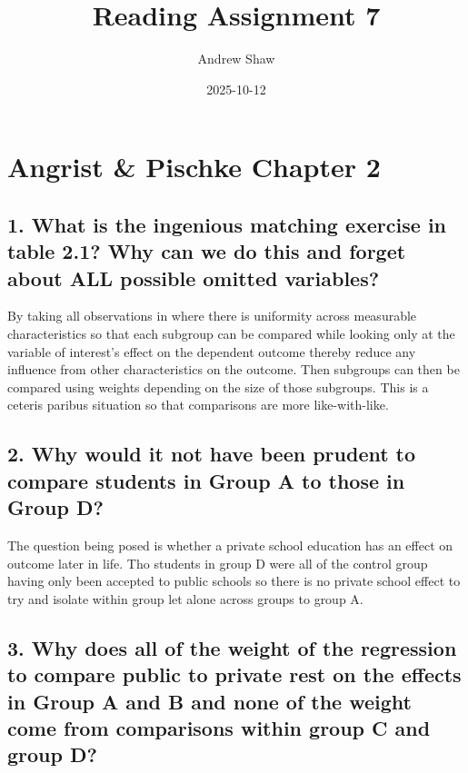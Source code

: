 \documentclass[
]{article}
\title{Reading Assignment 7}
\author{Andrew Shaw}
\date{2025-10-12}
\begin{document}
\maketitle

\section{Angrist \& Pischke Chapter 2}\label{angrist-pischke-chapter-2}

\subsection{1. What is the ingenious matching exercise in table 2.1? Why
can we do this and forget about ALL possible omitted
variables?}\label{what-is-the-ingenious-matching-exercise-in-table-2.1-why-can-we-do-this-and-forget-about-all-possible-omitted-variables}

By taking all observations in where there is uniformity across
measurable characteristics so that each subgroup can be compared while
looking only at the variable of interest's effect on the dependent
outcome thereby reduce any influence from other characteristics on the
outcome. Then subgroups can then be compared using weights depending on
the size of those subgroups. This is a ceteris paribus situation so that
comparisons are more like-with-like.

\subsection{2. Why would it not have been prudent to compare students in
Group A to those in Group
D?}\label{why-would-it-not-have-been-prudent-to-compare-students-in-group-a-to-those-in-group-d}

The question being posed is whether a private school education has an
effect on outcome later in life. Tho students in group D were all of the
control group having only been accepted to public schools so there is no
private school effect to try and isolate within group let alone across
groups to group A.

\subsection{3. Why does all of the weight of the regression to compare
public to private rest on the effects in Group A and B and none of the
weight come from comparisons within group C and group
D?}\label{why-does-all-of-the-weight-of-the-regression-to-compare-public-to-private-rest-on-the-effects-in-group-a-and-b-and-none-of-the-weight-come-from-comparisons-within-group-c-and-group-d}
\end{document}
